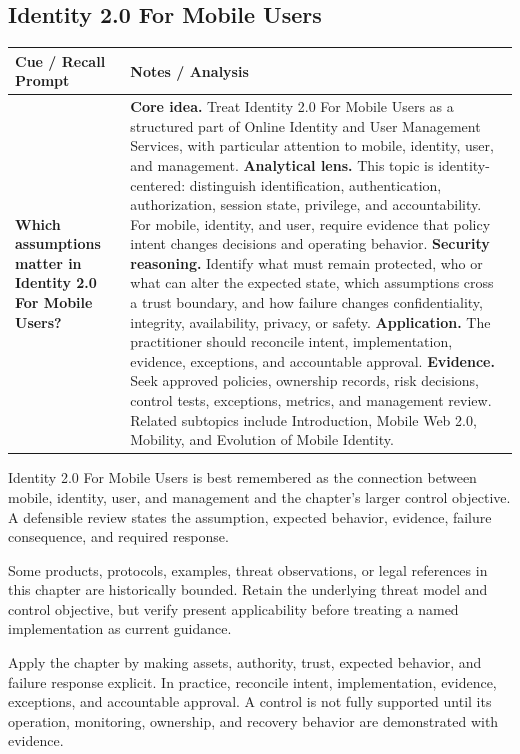 \documentclass[11pt]{article}
\newcommand{\CornellHeader}{%
\rowcolor{Navy}\color{white}\bfseries Cue / Recall Prompt & \color{white}\bfseries Notes / Analysis\\\hline}
\newcommand{\CornellRow}[2]{%
\cellcolor{CueGray}\RaggedRight\textbf{#1} & \RaggedRight #2\\\hline}
\begin{document}
\subsection*{Identity 2.0 For Mobile Users}
\begin{longtable}{>{\RaggedRight\arraybackslash}p{}|>{\RaggedRight\arraybackslash}p{}}
\CornellHeader
\CornellRow{Which assumptions matter in Identity 2.0 For Mobile Users?}{\textbf{Core idea.} Treat Identity 2.0 For Mobile Users as a structured part of Online Identity and User Management Services, with particular attention to mobile, identity, user, and management. \textbf{Analytical lens.} This topic is identity-centered: distinguish identification, authentication, authorization, session state, privilege, and accountability. For mobile, identity, and user, require evidence that policy intent changes decisions and operating behavior. \textbf{Security reasoning.} Identify what must remain protected, who or what can alter the expected state, which assumptions cross a trust boundary, and how failure changes confidentiality, integrity, availability, privacy, or safety. \textbf{Application.} The practitioner should reconcile intent, implementation, evidence, exceptions, and accountable approval. \textbf{Evidence.} Seek approved policies, ownership records, risk decisions, control tests, exceptions, metrics, and management review. Related subtopics include Introduction, Mobile Web 2.0, Mobility, and Evolution of Mobile Identity.}
\end{longtable}
\begin{topicsummary}
Identity 2.0 For Mobile Users is best remembered as the connection between mobile, identity, user, and management and the chapter's larger control objective. A defensible review states the assumption, expected behavior, evidence, failure consequence, and required response.
\end{topicsummary}
\begin{historybox}
Some products, protocols, examples, threat observations, or legal references in this chapter are historically bounded. Retain the underlying threat model and control objective, but verify present applicability before treating a named implementation as current guidance.
\end{historybox}
\begin{defensebox}
Apply the chapter by making assets, authority, trust, expected behavior, and failure response explicit. In practice, reconcile intent, implementation, evidence, exceptions, and accountable approval. A control is not fully supported until its operation, monitoring, ownership, and recovery behavior are demonstrated with evidence.
\end{defensebox}
\end{document}
